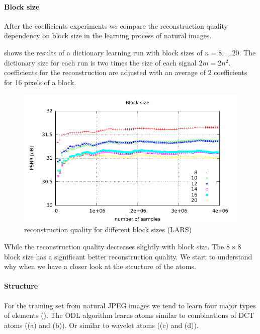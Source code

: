 


\paragraph{Block size}
After the coefficients experiments we compare the reconstruction quality
dependency on block size in the learning process of natural images. 

 shows the results of a dictionary
learning run with block sizes of $n=8,..,20$. The dictionary size for each run
is two times the size of each signal $2m=2n^2$. coefficients for the
reconstruction are adjusted with an average of 2 coefficients for 16 pixels of a
block.

\begin{figure}[h]
\centering
\includegraphics[width =
1.0\textwidth]{../tests/results/blockSizeConverg.pdf}
\caption{reconstruction quality for different block sizes (LARS)}
\label{fig:blockSize}
\end{figure}

While the reconstruction quality decreases slightly with block size. 
The $8\times8$ block size has a significant better reconstruction quality. 
We start to understand why when we have a closer look at the structure of
the atoms. 

\paragraph{Structure}
For the training set from natural JPEG images we tend to learn four major types
of elements ().
The ODL algorithm learns atoms similar to combinations of DCT atoms
((a) and (b)). Or similar to wavelet atoms ((c) and (d)).

